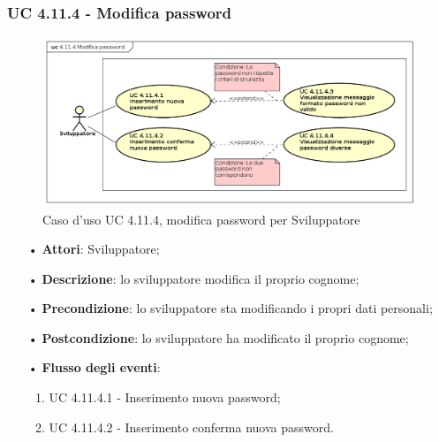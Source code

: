 \subsubsection{UC 4.11.4 - Modifica password}
\begin{figure}[H]
	\centering
	\includegraphics[width=15cm, keepaspectratio]{img/UC4114.png} 
	\caption{Caso d'uso UC 4.11.4, modifica password per Sviluppatore}\label{fig:4114}
\end{figure}
\begin{itemize}
	\item[•]\textbf{Attori}: Sviluppatore;
	\item[•]\textbf{Descrizione}: lo sviluppatore modifica il proprio cognome;
	\item[•]\textbf{Precondizione}: lo sviluppatore sta modificando i propri dati personali;
	\item[•]\textbf{Postcondizione}: lo sviluppatore ha modificato il proprio cognome; 
	\item[•]\textbf{Flusso degli eventi}: 
	\begin{enumerate}
		\item UC 4.11.4.1 - Inserimento nuova password;
		\item UC 4.11.4.2 - Inserimento conferma nuova password.
	\end{enumerate}
\end{itemize}


